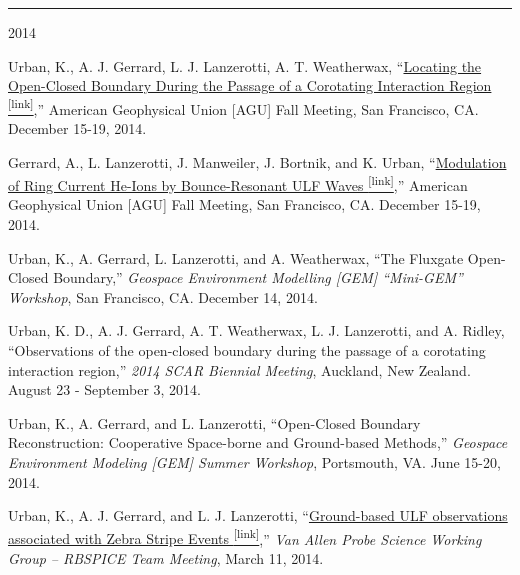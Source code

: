 \documentclass[10pt]{article}
\newcommand{\ressection}[1]{\noindent{\large\textbf{#1}}
\vspace{2pt}\hrule\vspace{4pt}}
\begin{document}
\vspace{0.2cm}
\ressection{Other Presentations}


\begin{center} \Large{2014} \end{center}
\normalsize
\begin{itemize*}
  \item
    Urban, K., A. J. Gerrard, L. J. Lanzerotti, A. T. Weatherwax,
    ``\href{http://adsabs.harvard.edu/abs/2014AGUFMSA13B3992U}{Locating
    the Open-Closed Boundary During the Passage of a Corotating
    Interaction Region \textsuperscript{\tiny{[link]}}},'' American Geophysical Union [AGU]  Fall
    Meeting, San Francisco, CA. December 15-19, 2014.

  \item 
    Gerrard, A., L. Lanzerotti, J. Manweiler, J. Bortnik, and K. Urban,
    ``\href{https://scholar.google.com/citations?view_op=view_citation&hl=en&user=KTLuoQkAAAAJ&citation_for_view=KTLuoQkAAAAJ:0EnyYjriUFMC}{Modulation
    of Ring Current He-Ions by Bounce-Resonant ULF Waves \textsuperscript{\tiny{[link]}}},'' 
    American Geophysical Union [AGU] Fall Meeting, San Francisco, CA.
    December 15-19, 2014.

  \item Urban, K., A. Gerrard, L. Lanzerotti, and A. Weatherwax, ``The
    Fluxgate Open-Closed Boundary,'' {\em Geospace Environment Modelling
    [GEM] ``Mini-GEM'' Workshop}, San Francisco, CA. December 14, 2014.

  \item Urban, K. D., A. J. Gerrard, A. T. Weatherwax, L. J.
    Lanzerotti, and A. Ridley, ``Observations of the open-closed
    boundary during the passage of a corotating interaction
    region,'' {\em 2014 SCAR Biennial Meeting}, Auckland, New
    Zealand. August 23 - September 3, 2014.

  \item 
  Urban, K., A. Gerrard, and L. Lanzerotti, ``Open-Closed Boundary
  Reconstruction: Cooperative Space-borne and Ground-based Methods,''
  {\em Geospace Environment Modeling [GEM] Summer Workshop},
    Portsmouth, VA. June 15-20, 2014.

  \item
    Urban, K., A. J. Gerrard, and L. J. Lanzerotti,
    ``\href{http://rbspgway.jhuapl.edu/rbsp_SWG_Mar_2014}{Ground-based ULF
    observations associated with Zebra Stripe Events \textsuperscript{\tiny{[link]}}},'' {\em Van
    Allen Probe Science Working Group -- RBSPICE Team Meeting}, March 11,
    2014.

\end{itemize*}
\end{document}
